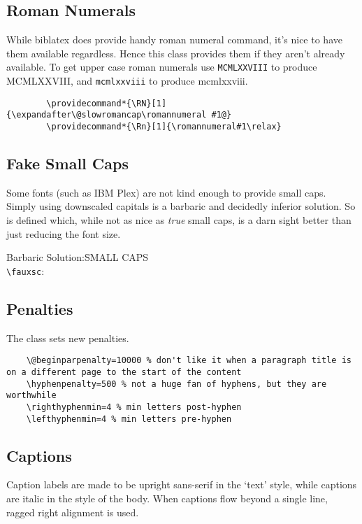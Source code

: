 \documentclass[solid,math,chem,code,plot]{bmc}
\begin{document}
\subsection{Roman Numerals}

While biblatex does provide handy roman numeral command,
it's nice to have them available regardless.
Hence this class provides them if they aren't already available.
To get upper case roman numerals use \texttt{\RN{1978}}
to produce \RN{1978}, and \texttt{\Rn{1978}}
to produce \Rn{1978}.

\begin{verbatim}
        \providecommand*{\RN}[1]{\expandafter\@slowromancap\romannumeral #1@}
        \providecommand*{\Rn}[1]{\romannumeral#1\relax}
\end{verbatim}

\subsection{Fake Small Caps}
Some fonts (such as IBM Plex) are not kind enough to provide small caps.
Simply using downscaled capitals is a barbaric and decidedly inferior solution.
So \texttt{\fauxsc{}} is defined which, while not as nice as \emph{true}
small caps, is a darn sight better than just reducing the font size.
\vspace{-6pt}
\begin{center}
    \parbox{0cm}{
        \begin{tabbing}
            Barbaric Solution:\quad \= S{\footnotesize MALL} C{\footnotesize APS} \\
            \texttt{\textbackslash fauxsc{}}: \> 
        \end{tabbing}}
\end{center}

\subsection{Penalties}
The class sets new penalties.
\begin{verbatim}
    \@beginparpenalty=10000 % don't like it when a paragraph title is on a different page to the start of the content
    \hyphenpenalty=500 % not a huge fan of hyphens, but they are worthwhile
    \righthyphenmin=4 % min letters post-hyphen
    \lefthyphenmin=4 % min letters pre-hyphen
\end{verbatim}

\subsection{Captions}
Caption labels are made to be upright sans-serif in the `text' style,
while captions are italic in the style of the body.
When captions flow beyond a single line, ragged right alignment is used.
\end{document}
